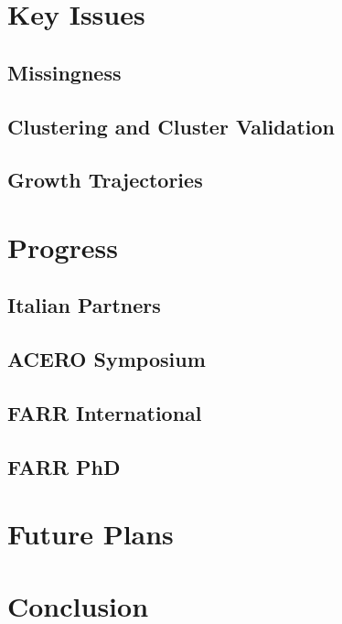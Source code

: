 \documentclass[bsc]{abdnthesis}
\begin{document}

\chapter{Key Issues}
\section{Missingness} %
\label{sec:missingness}

\section{Clustering and Cluster Validation} %
\label{sec:clustering_and_cluster_validation}

\section{Growth Trajectories} %
\label{sec:growth_trajectories}



\chapter{Progress}
\section{Italian Partners} %
\label{sec:italian_partners}

\section{ACERO Symposium} %
\label{sec:acero_symposium}

\section{FARR International} %
\label{sec:farr_international}

\section{FARR PhD} %
\label{sec:farr_phd}



\chapter{Future Plans}


\chapter{Conclusion}



\end{document}
